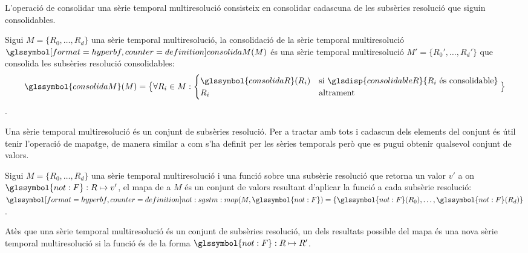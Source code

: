 L'operació de consolidar una sèrie temporal multiresolució consisteix
en consolidar cadascuna de les subsèries resolució que siguin
consolidables.
\begin{definition}
  Sigui $M=\{R_0,\dotsc,R_d\}$ una sèrie temporal multiresolució, la
  consolidació de la sèrie temporal multiresolució
  $\glssymboldef{consolidaM}(M)$ és una sèrie temporal multiresolució
  $M'=\{R_0',\dotsc,R_d'\}$ que consolida les subsèries resolució
  consolidables:
  \[
  \glssymbol{consolidaM}(M) = \big\{ \forall R_i\in M:
  \begin{cases}
    \glssymbol{consolidaR}(R_i) & \text{si }
    \glsdisp{consolidableR}{R_i \text{ és
        consolidable}}\\
    R_i & \text{altrament}
  \end{cases}\big\}
  \].
\end{definition}



Una sèrie temporal multiresolució és un conjunt de subsèries
resolució. Per a tractar amb tots i cadascun dels elements del conjunt
és útil tenir l'operació de mapatge, de manera similar a com s'ha
definit per les sèries temporals però que es pugui obtenir qualsevol
conjunt de valors.
 \begin{definition} %
   Sigui $M=\{R_0,\dotsc,R_d\}$ una sèrie temporal multiresolució i
    una funció sobre una subsèrie resolució que
   retorna un valor $v'$ a on $\glssymbol{not:F}:R\mapsto v'$, el mapa
   de  a $M$ és un conjunt de valors resultant
   d'aplicar la funció a cada subsèrie resolució:
   $\glssymboldef{not:sgstm:map}(M,\glssymbol{not:F}) = \{
   \glssymbol{not:F}(R_0), \dotsc, \glssymbol{not:F}(R_d) \}$.
\end{definition}
Atès que una sèrie temporal multiresolució és un conjunt de subsèries
resolució, un dels resultats possible del mapa és una nova sèrie
temporal multiresolució si la funció és de la forma
$\glssymbol{not:F}:R\mapsto R'$.







